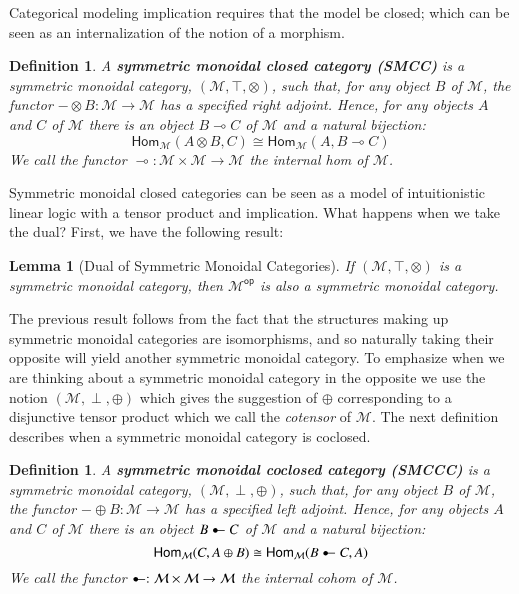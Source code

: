 \documentclass{lmcs}
\newtheorem{lemma}[theorem]{Lemma}
\newtheorem{definition}[theorem]{Definition}
\let\mto\to
\let\to\relax
\newcommand{\to}{\rightarrow}
\newcommand{\cat}[1]{\mathcal{#1}}
\newcommand{\catop}[1]{\cat{#1}^{\mathsf{op}}}
\newcommand{\Hom}[3]{\mathsf{Hom}_{\cat{#1}}(#2,#3)}
\newcommand{\limp}[0]{\multimap}
\newcommand{\colimp}[0]{\multimapdotinv}
\begin{document}
Categorical modeling implication requires that the model be closed;
which can be seen as an internalization of the notion of a morphism.
\begin{definition}
  \label{def:SMCC}
  A \textbf{symmetric monoidal closed category (SMCC)} is a symmetric
  monoidal category, $(\cat{M},\top,\otimes)$, such that, for any object
  $B$ of $\cat{M}$, the functor $- \otimes B : \cat{M} \mto \cat{M}$
  has a specified right adjoint.  Hence, for any objects $A$ and $C$
  of $\cat{M}$ there is an object $B \limp C$ of $\cat{M}$ and a
  natural bijection:
  \[
  \Hom{\cat{M}}{A \otimes B}{C} \cong \Hom{\cat{M}}{A}{B \limp C}
  \]
  We call the functor $\limp : \cat{M} \times \cat{M} \mto \cat{M}$
  the internal hom of $\cat{M}$.
\end{definition}

Symmetric monoidal closed categories can be seen as a model of
intuitionistic linear logic with a tensor product and implication.
What happens when we take the dual?  First, we have the following
result:
\begin{lemma}[Dual of Symmetric Monoidal Categories]
  \label{lemma:dual_of_symmetric_monoidal_categories}
  If $(\cat{M},\top,\otimes)$ is a symmetric monoidal category, then
  $\catop{M}$ is also a symmetric monoidal category.
\end{lemma}
The previous result follows from the fact that the structures making
up symmetric monoidal categories are isomorphisms, and so naturally
taking their opposite will yield another symmetric monoidal category.
To emphasize when we are thinking about a symmetric monoidal category
in the opposite we use the notion $(\cat{M},\perp,\oplus)$ which gives
the suggestion of $\oplus$ corresponding to a disjunctive tensor
product which we call the \textit{cotensor} of $\cat{M}$. The next
definition describes when a symmetric monoidal category is coclosed.
\begin{definition}
  \label{def:SMCC}
  A \textbf{symmetric monoidal coclosed category (SMCCC)} is a symmetric
  monoidal category, $(\cat{M},\perp,\oplus)$, such that, for any object
  $B$ of $\cat{M}$, the functor $- \oplus B : \cat{M} \mto \cat{M}$
  has a specified left adjoint.  Hence, for any objects $A$ and $C$
  of $\cat{M}$ there is an object $B \colimp C$ of $\cat{M}$ and a
  natural bijection:
  \[
  \Hom{\cat{M}}{C}{A \oplus B} \cong \Hom{\cat{M}}{B \colimp C}{A}
  \]
  We call the functor $\colimp : \cat{M} \times \cat{M} \mto \cat{M}$
  the internal cohom of $\cat{M}$.
\end{definition}
\end{document}
